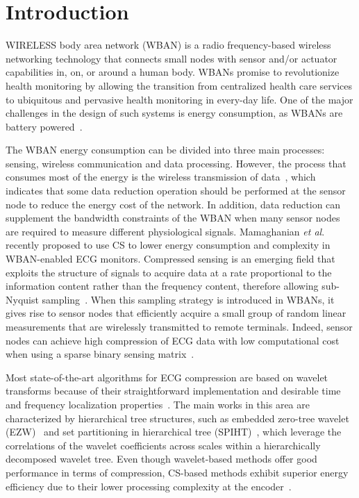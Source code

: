 \documentclass[journal]{IEEEtran}
\begin{document}
\IEEEpeerreviewmaketitle



\section{Introduction}
 WIRELESS body area network (WBAN) is a radio frequency-based wireless networking technology that connects small nodes  with sensor and/or actuator capabilities in, on, or around a human body. WBANs promise to revolutionize health monitoring by allowing the transition from centralized health care services to ubiquitous and pervasive health monitoring in every-day life. One of the major challenges in the design of such systems is energy consumption, as WBANs are battery powered~\cite{Huas09}.

The  WBAN energy consumption can be divided into three main processes: sensing, wireless communication and data processing. However, the process that consumes most of the energy is the wireless transmission of data~\cite{Huas09}, which indicates that some data reduction operation should be performed at the sensor node to reduce the energy cost of the network. In addition, data reduction can supplement the bandwidth constraints of the WBAN when many sensor nodes are required to measure different physiological signals. Mamaghanian \textit{et al}.~\cite{Mama11} recently proposed to use CS to lower energy consumption and complexity in WBAN-enabled ECG monitors. Compressed sensing is an emerging field that exploits the structure of signals to acquire data at a rate proportional to the information content rather than the frequency content, therefore allowing sub-Nyquist sampling~\cite{Dono06,Cand08}. When this sampling strategy is introduced in WBANs, it gives rise to sensor nodes that efficiently acquire a small group of random linear measurements that are wirelessly transmitted to remote terminals. Indeed, sensor nodes can achieve high compression of ECG data with low computational cost when using a sparse binary sensing matrix~\cite{Mama11}.

Most state-of-the-art algorithms for ECG compression are based on wavelet transforms because of their straightforward implementation and desirable time and frequency localization properties~\cite{Iste01,Hilt97,Zhita00}. The main works in this area are characterized by hierarchical tree structures, such as embedded zero-tree wavelet (EZW)~\cite{Hilt97} and set partitioning in hierarchical tree (SPIHT)~\cite{Zhita00}, which leverage the correlations of the wavelet coefficients across scales within a hierarchically decomposed wavelet tree. Even though wavelet-based methods offer good performance in terms of compression, CS-based methods exhibit superior energy efficiency due to their lower processing complexity at the encoder~\cite{Mama11, Dixo12}.
\end{document}
